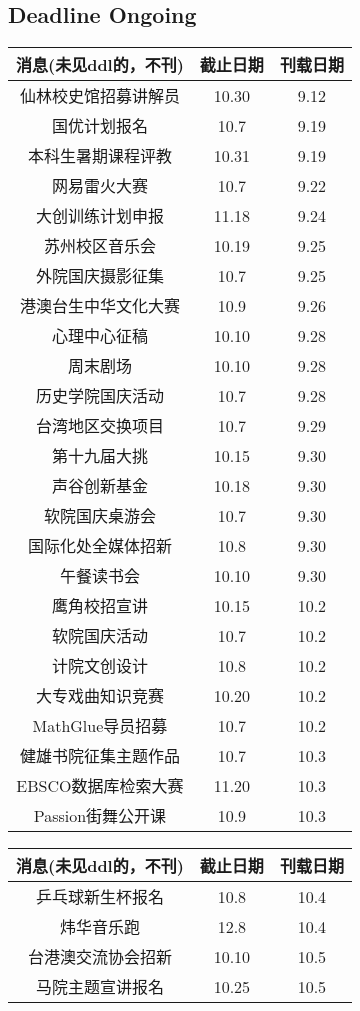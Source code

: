 \documentclass[letterpaper, 12pt]{article}
\begin{document}
\begin{multicols}{2}
\section{Deadline Ongoing}
\begin{tabular}{|c|c|c|}
    \hline
    消息(未见ddl的，不刊) & 截止日期 & 刊载日期\\
    \hline\hline
    仙林校史馆招募讲解员 & 10.30 & 9.12\\
    国优计划报名 & 10.7 & 9.19\\
    本科生暑期课程评教 & 10.31 & 9.19\\
    网易雷火大赛 & 10.7 & 9.22\\
    大创训练计划申报 & 11.18 & 9.24\\
    苏州校区音乐会 & 10.19 & 9.25\\
    外院国庆摄影征集 & 10.7 & 9.25\\
    港澳台生中华文化大赛 & 10.9 & 9.26\\
    心理中心征稿 & 10.10 & 9.28\\
    周末剧场 & 10.10 & 9.28\\
    历史学院国庆活动 & 10.7 & 9.28\\
    台湾地区交换项目 & 10.7 & 9.29\\
    第十九届大挑 & 10.15 & 9.30\\
    声谷创新基金 & 10.18 & 9.30\\
    软院国庆桌游会 & 10.7 & 9.30\\
    国际化处全媒体招新 & 10.8 & 9.30\\
    午餐读书会 & 10.10 & 9.30\\
    鹰角校招宣讲 & 10.15 & 10.2\\
    软院国庆活动 & 10.7 & 10.2\\
    计院文创设计 & 10.8 & 10.2\\
    大专戏曲知识竞赛 & 10.20 & 10.2\\
    MathGlue导员招募 & 10.7 & 10.2\\
    健雄书院征集主题作品 & 10.7 & 10.3\\
    EBSCO数据库检索大赛 & 11.20 & 10.3\\
    Passion街舞公开课 & 10.9 & 10.3\\
    \hline
\end{tabular}
\begin{tabular}{|c|c|c|}
    \hline
    消息(未见ddl的，不刊) & 截止日期 & 刊载日期\\
    \hline\hline
    乒乓球新生杯报名 & 10.8 & 10.4\\
    炜华音乐跑 & 12.8 & 10.4\\
    台港澳交流协会招新 & 10.10 & 10.5\\
    马院主题宣讲报名 & 10.25 & 10.5\\
        \hline
\end{tabular}

\end{multicols}
\end{document}
